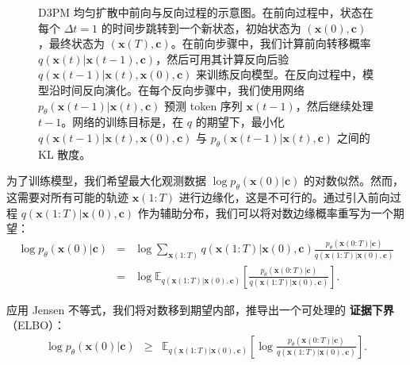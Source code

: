 \begin{figure}[!t]
\centering
{}
\caption{D3PM 均匀扩散中前向与反向过程的示意图。在前向过程中，状态在每个 $\Delta t = 1$ 的时间步跳转到一个新状态，初始状态为 $(\mathbf{x}(0), \mathbf{c})$，最终状态为 $(\mathbf{x}(T), \mathbf{c})$。在前向步骤中，我们计算前向转移概率 $q(\mathbf{x}(t) | \mathbf{x}(t - 1), \mathbf{c})$，然后可用其计算反向后验 $q(\mathbf{x}(t-1)| \mathbf{x}(t),\mathbf{x}(0),\mathbf{c})$ 来训练反向模型。在反向过程中，模型沿时间反向演化。在每个反向步骤中，我们使用网络 $p_\theta(\mathbf{x}(t-1)| \mathbf{x}(t),\mathbf{c})$ 预测 token 序列 $\mathbf{x}(t-1)$，然后继续处理 $t - 1$。网络的训练目标是，在 $q$ 的期望下，最小化 $q(\mathbf{x}(t-1)| \mathbf{x}(t),\mathbf{x}(0),\mathbf{c})$ 与 $p_\theta(\mathbf{x}(t-1)| \mathbf{x}(t),\mathbf{c})$ 之间的 KL 散度。}
\label{fig:d3pm-forward-and-reverse-processes}
\end{figure}

为了训练模型，我们希望最大化观测数据 $\log p_\theta(\mathbf{x}(0) | \mathbf{c})$ 的对数似然。然而，这需要对所有可能的轨迹 $\mathbf{x}(1{:}T)$ 进行边缘化，这是不可行的。通过引入前向过程 $q(\mathbf{x}(1{:}T) | \mathbf{x}(0), \mathbf{c})$ 作为辅助分布，我们可以将对数边缘概率重写为一个期望：
\begin{eqnarray}
\log p_\theta(\mathbf{x}(0) | \mathbf{c}) & = & \log\sum_{\mathbf{x}(1{:}T)} q(\mathbf{x}(1{:}T) | \mathbf{x}(0), \mathbf{c}) \frac{p_\theta(\mathbf{x}(0{:}T) | \mathbf{c})}{q(\mathbf{x}(1{:}T) | \mathbf{x}(0), \mathbf{c})} \nonumber \\
& = & \log \mathbb{E}_{q(\mathbf{x}(1{:}T) | \mathbf{x}(0), \mathbf{c})} \left[ \frac{p_\theta(\mathbf{x}(0{:}T) | \mathbf{c})}{q(\mathbf{x}(1{:}T) | \mathbf{x}(0), \mathbf{c})} \right].
\end{eqnarray}

\noindent 应用 Jensen 不等式，我们将对数移到期望内部，推导出一个可处理的 \textbf{证据下界}（ELBO）：
\begin{eqnarray}
\log p_\theta(\mathbf{x}(0) | \mathbf{c}) & \ge & \mathbb{E}_{q(\mathbf{x}(1{:}T) | \mathbf{x}(0), \mathbf{c})} \left[ \log \frac{p_\theta(\mathbf{x}(0{:}T) | \mathbf{c})}{q(\mathbf{x}(1{:}T) | \mathbf{x}(0), \mathbf{c})} \right].
\end{eqnarray}

